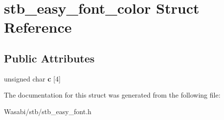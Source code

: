 \hypertarget{structstb__easy__font__color}{}\section{stb\+\_\+easy\+\_\+font\+\_\+color Struct Reference}
\label{structstb__easy__font__color}
\subsection*{Public Attributes}
\begin{DoxyCompactItemize}
\item 
unsigned char {\bfseries c} \mbox{[}4\mbox{]}\hypertarget{structstb__easy__font__color_a95c5f7f5c39ce7d4e15a2accd1a321ca}{}\label{structstb__easy__font__color_a95c5f7f5c39ce7d4e15a2accd1a321ca}

\end{DoxyCompactItemize}


The documentation for this struct was generated from the following file\+:\begin{DoxyCompactItemize}
\item 
Wasabi/stb/stb\+\_\+easy\+\_\+font.\+h\end{DoxyCompactItemize}
